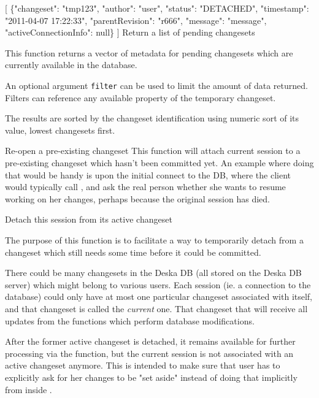 \documentclass{article}
\begin{document}
    {[
     \{"changeset": "tmp123", "author": "user", "status": "DETACHED", "timestamp": "2011-04-07 17:22:33",
     "parentRevision": "r666", "message": "message", \\ "activeConnectionInfo": null\}
    ]}
    {Return a list of pending changesets}
    {This function returns a vector of metadata for pending changesets which are currently available in the
    database.

    An optional argument {\tt filter} can be used to limit the amount of data returned.  Filters can reference any
    available property of the temporary changeset.

    The results are sorted by the changeset identification using numeric sort of its value, lowest changesets first.}

    {}
    {Re-open a pre-existing changeset}
    {This function will attach current session to a pre-existing changeset which hasn't been committed yet. An example
    where doing that would be handy is upon the initial connect to the DB, where the client would typically call
    , and ask the real person whether she wants to resume working on her changes,
    perhaps because the original session has died.}

    {}
    {Detach this session from its active changeset}
    {The purpose of this function is to facilitate a way to temporarily detach from a changeset which still needs some
    time before it could be committed.

    There could be many changesets in the Deska DB (all stored on the Deska DB server) which might belong to various
    users.  Each session (ie. a connection to the database) could only have at most one particular changeset associated
    with itself, and that changeset is called the {\em current} one.  That changeset that will receive all updates from
    the functions which perform database modifications.

    After the former active changeset is detached, it remains available for further processing via the
     function, but the current session is not associated with an active changeset anymore.
    This is intended to make sure that user has to explicitly ask for her changes to be "set aside" instead of doing
    that implicitly from inside .}
\end{document}

